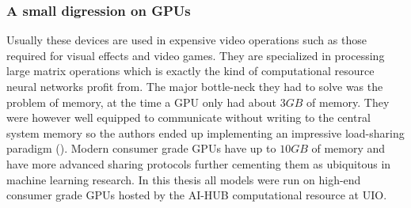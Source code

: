 \subsubsection{A small digression on GPUs}
Usually these devices are used in expensive video operations such as those required for visual effects and video games. They are specialized in processing large matrix operations which is exactly the kind of computational resource neural networks profit from. The major bottle-neck they had to solve was the problem of memory, at the time a GPU only had about $3 GB$ of memory. They were however well equipped to communicate without writing to the central system memory so the authors ended up implementing an impressive load-sharing paradigm (\cite{Krizhevsky2012}). Modern consumer grade GPUs have up to $10 GB$ of memory and have more advanced sharing protocols further cementing them as ubiquitous in machine learning research. In this thesis all models were run on high-end consumer grade GPUs hosted by the AI-HUB computational resource at UIO.


